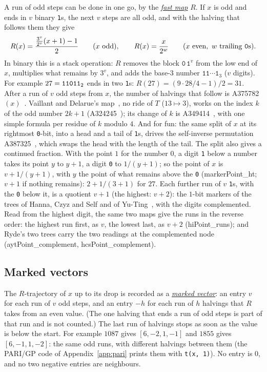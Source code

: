 \documentclass[11pt,a4paper,titlepage]{article}
\makeatletter
\newcommand{\termhere}[1]{\leavevmode
  \Hy@raisedlink{\hyper@anchorstart{term:#1}\hyper@anchorend}}
\newcommand{\keyterm}[2]{\hyperlink{box:#1}{\emph{#2}}}
\newcommand{\lean}[1]{\textsf{#1}}
\newcommand{\bin}[1]{\text{\texttt{#1}}_2}
\makeatother
\begin{document}
\termhere{R}A run of odd steps can be done in one go, by the \keyterm{R}{fast map} $R$. If $x$ is odd and ends in $v$ binary
\texttt{1}s, the next $v$ steps are all odd, and with the halving that follows them they give
\[
R(x) = \frac{\tfrac{3^v}{2^v}(x+1) - 1}{2} \qquad (x \text{ odd}),
\qquad R(x) = \frac{x}{2^w} \qquad (x \text{ even}, \ w \text{ trailing \texttt{0}s}).
\]
In binary this is a stack operation: $R$ removes the block $\texttt{0}\,\texttt{1}^v$ from the low
end of $x$, multiplies what remains by $3^v$, and adds the base-$3$ number
$\texttt{11}\cdots\texttt{1}_3$ ($v$ digits).
For example $27 = \bin{11011}$ ends in two \texttt{1}s: $R(27) = (9\cdot 28/4 - 1)/2 = 31$.
After a run of $v$ odd steps from $x$, the number of halvings that follow is
A375782$(x)$~\cite{OEIS_A375782}. Vaillant and Delarue's map~\cite{VaillantDelarue2019}, no ride of $T$ ($13 \mapsto 3$), works on the index $k$ of the odd number $2k+1$
(A324245~\cite{OEIS_A324245}); its change of $k$ is
A349414~\cite{OEIS_A349414}, with one simple formula per residue of $k$
modulo $4$. And for fun: the same split of $x$ at its rightmost
\texttt{0}-bit, into a head and a tail of \texttt{1}s, drives the self-inverse permutation
A387325~\cite{OEIS_A387325}, which swaps the head with the length of the tail.
The split also gives a continued fraction. With the point $1$ for the number $0$, a digit
\texttt{1} below a number takes its point $y$ to $y+1$, a digit \texttt{0} to $1/(y+1)$; so the
point of $x$ is $v + 1/(y+1)$, with $y$ the point of what remains above the \texttt{0} (\lean{markerPoint\_ht}; $v + 1$ if nothing remains):
$2 + 1/(3+1)$ for $27$. Each further run of $v$ \texttt{1}s, with the \texttt{0} below it, is a
quotient $v+1$ (the highest: $v+2$): the $1$-bit markers of the trees of Hanna, Czyz and Self
and of Yu-Ting~\cite{Ryde2020}, with the digits complemented. Read from the highest digit,
the same two maps give the runs in the reverse order: the highest run first, as $v$, the
lowest last, as $v+2$ (\lean{hiPoint\_runs}); and Ryde's two trees carry the two readings at
the complemented node (\lean{aytPoint\_complement}, \lean{hcsPoint\_complement}).

\subsection*{Marked vectors}

\termhere{markedvector}The $R$-trajectory of $x$ up to its drop is recorded as a \keyterm{markedvector}{marked
vector}: an entry $v$ for each run of $v$ odd steps, and an entry $-h$ for each
run of $h$ halvings that $R$ takes from an even value. (The one halving that ends
a run of odd steps is part of that run and is not counted.) The last run of
halvings stops as soon as the value is below the start. For example $1087$ gives
$[6, -2, 1, -1]$ and $1855$ gives $[6, -1, 1, -2]$: the same odd runs, with
different halvings between them (the PARI/GP code of Appendix~\ref{app:pari} prints
them with \texttt{t(x, 1)}). No entry is $0$, and no two negative entries are
neighbours.
\end{document}
